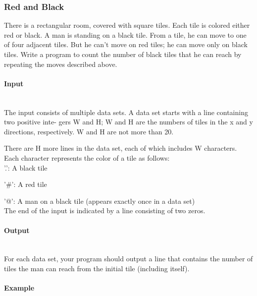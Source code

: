 \documentclass{article}
\begin{document}
\subsubsection{Red and Black}
 
There is a rectangular room, covered with square tiles. Each tile is colored either red or black. A
man is standing on a black tile. From a tile, he can move to one of four adjacent tiles. But he can’t
move on red tiles; he can move only on black tiles. Write a program to count the number of black
tiles that he can reach by repeating the moves described above.

\paragraph{Input} \mbox{} \\

The input consists of multiple data sets. A data set starts with a line containing two positive inte-
gers W and H; W and H are the numbers of tiles in the x and y directions, respectively. W and H
are not more than 20.

There are H more lines in the data set, each of which includes W characters. Each character
represents the color of a tile as follows:\\

'.': A black tile 

'\#': A red tile 

'@': A man on a black tile (appears exactly once in a data set) \\

The end of the input is indicated by a line consisting of two zeros.

\paragraph{Output}\mbox{} \\

For each data set, your program should output a line that contains the number of tiles the man can
reach from the initial tile (including itself).

\paragraph{Example}\mbox{} \\
\end{document}

